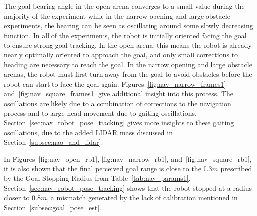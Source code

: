 The goal bearing angle in the open arena converges to a small value during the majority of the experiment
while in the narrow opening and large obstacle experiments, the bearing can be seen as oscillating
around some slowly decreasing function. In all of the experiments, the robot is initially oriented facing the goal
to ensure strong goal tracking. In the open arena, this means the robot is already nearly optimally oriented
to approach the goal, and only small corrections to heading are necessary to reach the goal.
In the narrow opening and large obstacle arenas, the robot must first turn away from the goal to
avoid obstacles before the robot can start to face the goal again. Figures~\ref{fig:nav_narrow_frames1}
and~\ref{fig:nav_square_frames1} give additional insight into this process.
The oscillations are likely due to a combination of corrections to the navigation process
and to large head movement due to gaiting oscillations. Section~\ref{sec:nav_robot_pose_tracking} gives
more insights to these gaiting oscillations, due to the added LIDAR mass discussed in 
Section~\ref{subsec:nao_and_lidar}.


In Figures~\ref{fig:nav_open_rb1}, \ref{fig:nav_narrow_rb1}, and~\ref{fig:nav_square_rb1},
it is also shown that the final perceived goal range is close to the $0.3 m$ prescribed by the Goal Stopping
Radius from Table~\ref{tab:nav_params1}. Section~\ref{sec:nav_robot_pose_tracking} shows that the robot
stopped at a radius closer to $0.8 m$, a mismatch generated by the lack of calibration mentioned in
Section~\ref{subsec:goal_pose_est}.

